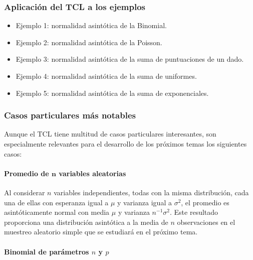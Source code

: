 \documentclass[
]{article}
\providecommand{\tightlist}{%
  \setlength{\itemsep}{0pt}\setlength{\parskip}{0pt}}
\begin{document}
\subsubsection{Aplicación del TCL a los ejemplos}\label{aplicaciuxf3n-del-tcl-a-los-ejemplos}

\begin{itemize}
\tightlist
\item
  Ejemplo 1: normalidad asintótica de la Binomial.
\item
  Ejemplo 2: normalidad asintótica de la Poisson.
\item
  Ejemplo 3: normalidad asintótica de la suma de puntuaciones de un dado.
\item
  Ejemplo 4: normalidad asintótica de la suma de uniformes.
\item
  Ejemplo 5: normalidad asintótica de la suma de exponenciales.
\end{itemize}

\subsubsection{Casos particulares más notables}\label{casos-particulares-muxe1s-notables}

Aunque el TCL tiene multitud de casos particulares interesantes, son especialmente relevantes para el desarrollo de los próximos temas los siguientes casos:

\paragraph{\texorpdfstring{Promedio de \(\boldsymbol{n}\) variables aleatorias}{Promedio de \textbackslash boldsymbol\{n\} variables aleatorias}}\label{promedio-de-boldsymboln-variables-aleatorias}

Al considerar \(n\) variables independientes, todas con la misma distribución, cada una de ellas con esperanza igual a \(\mu\) y varianza igual a \(\sigma^{2}\), el promedio es asintóticamente normal con media \(\mu\) y varianza \(n^{-1} \sigma^{2}\). Este resultado proporciona una distribución asintótica a la media de \(n\) observaciones en el muestreo aleatorio simple que se estudiará en el próximo tema.

\paragraph{\texorpdfstring{Binomial de parámetros \(n\) y \(p\)}{Binomial de parámetros n y p}}\label{binomial-de-paruxe1metros-n-y-p}
\end{document}
